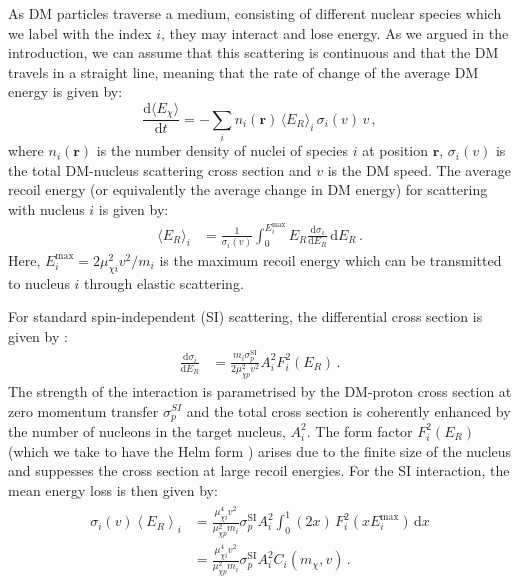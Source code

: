\documentclass[prd,twocolumn,showpacs,nofootinbib,aps]{revtex4-1}
\newcommand{\avg}[1]{\left\langle #1\right\rangle}
\newcommand{\dbd}[2]{\frac{\mathrm{d}#1}{\mathrm{d}#2}}
\begin{document}
As DM particles traverse a medium, consisting of different nuclear species which we label with the index $i$, they may interact and lose energy. As we argued in the introduction, we can assume that this scattering is continuous and that the DM travels in a straight line, meaning that the rate of change of the average DM energy is given by:
\begin{equation}
\label{eq:energyloss}
\dbd{\langle E_\chi \rangle}{t} = -\sum_{i} n_i(\mathbf{r}) \, \langle E_R \rangle_i \,\sigma_i(v) \, v\,,
\end{equation} 
where $n_i(\mathbf{r})$ is the number density of nuclei of species $i$ at position $\mathbf{r}$, $\sigma_i(v)$ is the total DM-nucleus scattering cross section and $v$ is the DM speed. The average recoil energy (or equivalently the average change in DM energy) for scattering with nucleus $i$ is given by:
\begin{align}
\langle E_R \rangle_i&= \frac{1}{\sigma_i(v)}\int_{0}^{E^{\mathrm{max}}_i} E_R \dbd{\sigma_i}{E_R} \, \mathrm{d}E_R\,.
\end{align}
Here, $E_i^\mathrm{max} = 2 \mu_{\chi i}^2 v^2/m_i$ is the maximum recoil energy which can be transmitted to nucleus $i$ through elastic scattering.

For standard spin-independent (SI) scattering, the differential cross section is given by \cite{Lewin:1995rx,Cerdeno:2010jj}:
\begin{align}
\dbd{\sigma_i}{E_R} &= \frac{m_i \sigma_p^{\mathrm{SI}}}{2 \mu_{\chi p}^2 v^2} A_i^2 F_i^2(E_R)\,.
\end{align}
The strength of the interaction is parametrised by the DM-proton cross section at zero momentum transfer $\sigma_p^{SI}$ and the total cross section is coherently enhanced by the number of nucleons in the target nucleus, $A_i^2$. The form factor $F_i^2(E_R)$ (which we take to have the Helm form \cite{Helm:1956zz,Duda:2006uk}) arises due to the finite size of the nucleus and suppesses the cross section at large recoil energies. For the SI interaction, the mean energy loss is then given by:
\begin{align}
\begin{split}
\sigma_i (v) \avg{E_R}_i &= \frac{\mu_{\chi i}^4 v^2}{\mu_{\chi p}^2 m_i} \sigma_p^{\mathrm{SI}}A_i^2 \int_0^1 (2x)\,F_i^2(x E_i^\mathrm{max})\, \mathrm{d}x\\
&=\frac{\mu_{\chi i}^4 v^2}{\mu_{\chi p}^2 m_i} \sigma_p^{\mathrm{SI}}A_i^2 C_i(m_\chi, v)\,.
\end{split}
\end{align}
\end{document}
